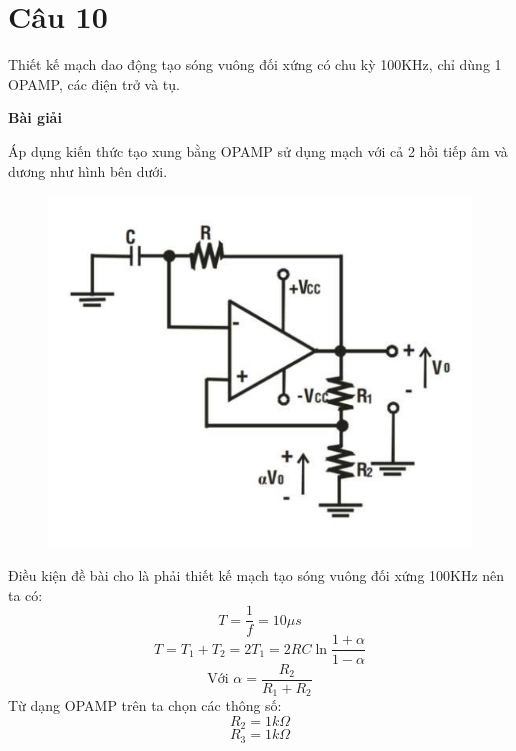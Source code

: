 \section{Câu 10}
Thiết kế mạch dao động tạo sóng vuông đối xứng có chu kỳ 100KHz, chỉ dùng 1
OPAMP, các điện trở và tụ.

\begin{center}
\textbf{Bài giải}
\end{center}

Áp dụng kiến thức tạo xung bằng OPAMP sử dụng mạch với cả 2 hồi tiếp âm và dương như hình bên dưới.
\begin{figure}[H]
    \centering
    \includegraphics[scale=0.6]{image/StandardDesign_Cau10.png}
\end{figure}
Điều kiện đề bài cho là phải thiết kế mạch tạo sóng vuông đối xứng 100KHz nên ta có:
\begin{equation*}
    T = \dfrac{1}{f} = 10\mu s
\end{equation*}
\begin{equation*}
    T = T_1 + T_2 = 2T_1 = 2RC\ln\dfrac{1+\alpha}{1-\alpha}
\end{equation*}
\begin{equation*}
    \text{Với }  \alpha = \dfrac{R_2}{R_1 + R_2}
\end{equation*}
Từ dạng OPAMP trên ta chọn các thông số:
\begin{equation*}
    R_2 = 1k\Omega
\end{equation*}
\begin{equation*}
    R_3 = 1k\Omega
\end{equation*}
